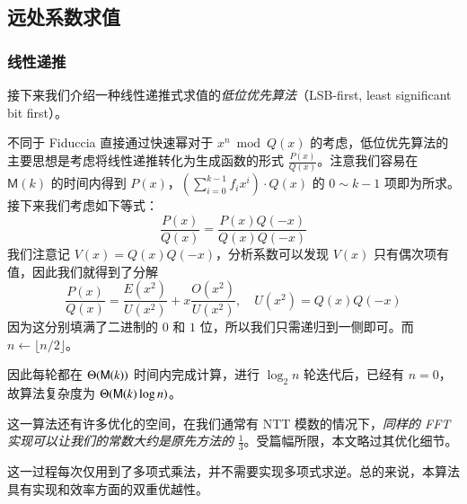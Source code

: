 \subsection{远处系数求值}

\subsubsection{线性递推}

接下来我们介绍一种线性递推式求值的\emph{低位优先算法}（LSB-first, least significant bit first）。

不同于 Fiduccia 直接通过快速幂对于 $x^n \bmod Q(x)$ 的考虑，低位优先算法的主要思想是考虑将线性递推转化为生成函数的形式 $\frac{P(x)}{Q(x)}$。注意我们容易在 $\mathsf M(k)$ 的时间内得到 $P(x)$，$\left(\sum_{i=0}^{k-1} f_i x^i\right) \cdot Q(x)$ 的 $0\sim k-1$ 项即为所求。接下来我们考虑如下等式：
$$
\frac {P(x)}{Q(x)} = \frac{P(x)Q(-x)}{Q(x)Q(-x)}
$$
我们注意记 $V(x)=Q(x)Q(-x)$，分析系数可以发现 $V(x)$ 只有偶次项有值，因此我们就得到了分解
$$
\frac{P(x)}{Q(x)} = \frac {E(x^2)}{U(x^2)} + x\frac {O(x^2)}{U(x^2)}, \quad U(x^2)=Q(x)Q(-x)
$$
因为这分别填满了二进制的 $0$ 和 $1$ 位，所以我们只需递归到一侧即可。而 $n \leftarrow \lfloor n/2 \rfloor$。

因此每轮都在 $\Theta(\mathsf M(k))$ 时间内完成计算，进行 $\log_2 n$ 轮迭代后，已经有 $n=0$，故算法复杂度为 $\Theta(\mathsf M(k)\log n)$。

这一算法还有许多优化的空间，在我们通常有 NTT 模数的情况下，\emph{同样的 FFT 实现可以让我们的常数大约是原先方法的} $\frac {1}{3}$。受篇幅所限，本文略过其优化细节。

这一过程每次仅用到了多项式乘法，并不需要实现多项式求逆。总的来说，本算法具有实现和效率方面的双重优越性。




